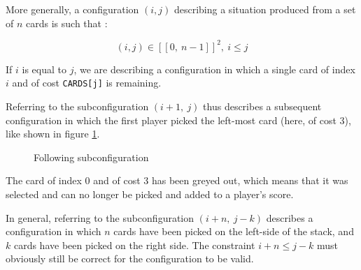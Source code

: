 \documentclass[a4paper,12pt,fleqn]{article}
\begin{document}
More generally, a configuration $(i,j)$ describing a situation produced from a set of $n$ cards is such that :

$$ (i,j) \in [\![0,\ n-1]\!]^2, \ i \leq j $$

If $i$ is equal to $j$, we are describing a configuration in which a single card of index $i$ and of cost \texttt{CARDS[j]} is remaining.

\medskip

Referring to the subconfiguration $(i+1,\ j)$ thus describes a subsequent configuration in which the first player picked the left-most card (here, of cost 3), like shown in figure \ref{fig:example_diag_02}.

\begin{figure}[H]
    \centering
    \caption{Following subconfiguration}
    \label{fig:example_diag_02}
\end{figure}

The card of index 0 and of cost 3 has been greyed out, which means that it was selected and can no longer be picked and added to a player's score.

\medskip

In general, referring to the subconfiguration $(i+n,\ j-k)$ describes a configuration in which $n$ cards have been picked on the left-side of the stack, and $k$ cards have been picked on the right side. The constraint $i+n \leq j-k$ must obviously still be correct for the configuration to be valid.
\end{document}
